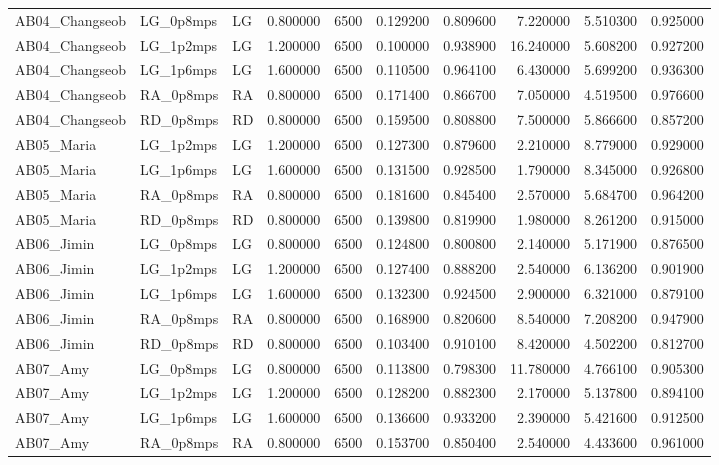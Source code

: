 \begin{table}
\begin{tabular}{lllrrrrrrr}
AB04\_Changseob & LG\_0p8mps & LG & 0.800000 & 6500 & 0.129200 & 0.809600 & 7.220000 & 5.510300 & 0.925000 \\
AB04\_Changseob & LG\_1p2mps & LG & 1.200000 & 6500 & 0.100000 & 0.938900 & 16.240000 & 5.608200 & 0.927200 \\
AB04\_Changseob & LG\_1p6mps & LG & 1.600000 & 6500 & 0.110500 & 0.964100 & 6.430000 & 5.699200 & 0.936300 \\
AB04\_Changseob & RA\_0p8mps & RA & 0.800000 & 6500 & 0.171400 & 0.866700 & 7.050000 & 4.519500 & 0.976600 \\
AB04\_Changseob & RD\_0p8mps & RD & 0.800000 & 6500 & 0.159500 & 0.808800 & 7.500000 & 5.866600 & 0.857200 \\
AB05\_Maria & LG\_1p2mps & LG & 1.200000 & 6500 & 0.127300 & 0.879600 & 2.210000 & 8.779000 & 0.929000 \\
AB05\_Maria & LG\_1p6mps & LG & 1.600000 & 6500 & 0.131500 & 0.928500 & 1.790000 & 8.345000 & 0.926800 \\
AB05\_Maria & RA\_0p8mps & RA & 0.800000 & 6500 & 0.181600 & 0.845400 & 2.570000 & 5.684700 & 0.964200 \\
AB05\_Maria & RD\_0p8mps & RD & 0.800000 & 6500 & 0.139800 & 0.819900 & 1.980000 & 8.261200 & 0.915000 \\
AB06\_Jimin & LG\_0p8mps & LG & 0.800000 & 6500 & 0.124800 & 0.800800 & 2.140000 & 5.171900 & 0.876500 \\
AB06\_Jimin & LG\_1p2mps & LG & 1.200000 & 6500 & 0.127400 & 0.888200 & 2.540000 & 6.136200 & 0.901900 \\
AB06\_Jimin & LG\_1p6mps & LG & 1.600000 & 6500 & 0.132300 & 0.924500 & 2.900000 & 6.321000 & 0.879100 \\
AB06\_Jimin & RA\_0p8mps & RA & 0.800000 & 6500 & 0.168900 & 0.820600 & 8.540000 & 7.208200 & 0.947900 \\
AB06\_Jimin & RD\_0p8mps & RD & 0.800000 & 6500 & 0.103400 & 0.910100 & 8.420000 & 4.502200 & 0.812700 \\
AB07\_Amy & LG\_0p8mps & LG & 0.800000 & 6500 & 0.113800 & 0.798300 & 11.780000 & 4.766100 & 0.905300 \\
AB07\_Amy & LG\_1p2mps & LG & 1.200000 & 6500 & 0.128200 & 0.882300 & 2.170000 & 5.137800 & 0.894100 \\
AB07\_Amy & LG\_1p6mps & LG & 1.600000 & 6500 & 0.136600 & 0.933200 & 2.390000 & 5.421600 & 0.912500 \\
AB07\_Amy & RA\_0p8mps & RA & 0.800000 & 6500 & 0.153700 & 0.850400 & 2.540000 & 4.433600 & 0.961000 \\

\end{tabular}
\end{table}
